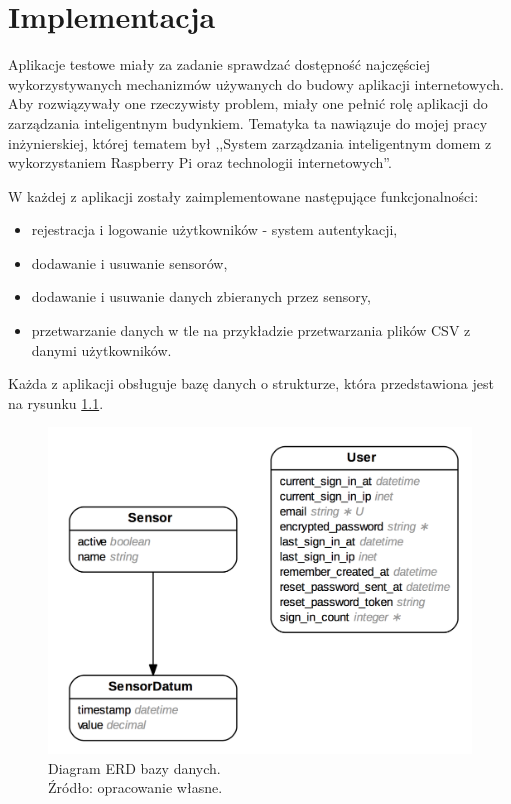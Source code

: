 \chapter{Implementacja}
Aplikacje testowe miały za zadanie sprawdzać dostępność najczęściej wykorzystywanych mechanizmów używanych do budowy aplikacji internetowych. Aby rozwiązywały one rzeczywisty problem, miały one pełnić rolę aplikacji do zarządzania inteligentnym budynkiem. Tematyka ta nawiązuje do mojej pracy inżynierskiej, której tematem był ,,System zarządzania inteligentnym domem z wykorzystaniem Raspberry Pi oraz technologii internetowych''.

W każdej z aplikacji zostały zaimplementowane następujące funkcjonalności:
\begin{itemize}
  \item rejestracja i logowanie użytkowników - system autentykacji,
  \item dodawanie i usuwanie sensorów,
  \item dodawanie i usuwanie danych zbieranych przez sensory,
  \item przetwarzanie danych w tle na przykładzie przetwarzania plików CSV z danymi użytkowników.
\end{itemize}

Każda z aplikacji obsługuje bazę danych o strukturze, która przedstawiona jest na rysunku \ref{fig:diagram_erd}.

\begin{figure}[h]
  \centering
  \includegraphics[width=\linewidth]{images/diagram_erd}
  \caption{Diagram ERD bazy danych.\\Źródło: opracowanie własne.}
  \label{fig:diagram_erd}
\end{figure}
\newpage
